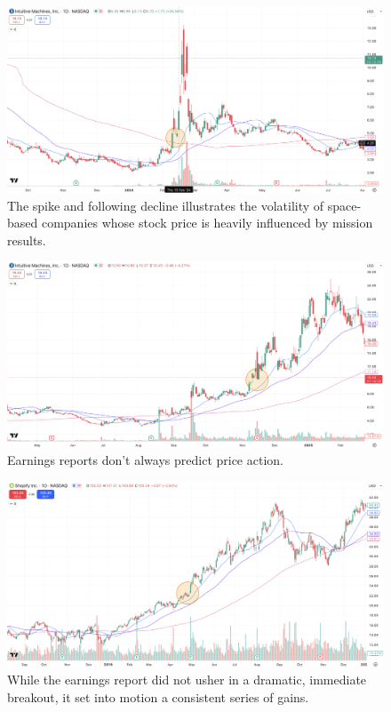 \documentclass[11pt]{article}
\begin{document}
    \begin{figure}[H]
        \centering
        \includegraphics[width=1.0\linewidth]{images/LUNR1.png}
        \caption{The spike and following decline illustrates the volatility of space-based companies whose stock price is heavily influenced by mission results.}
        \label{fig:LUNR1}
    \end{figure}

    \begin{figure}[H]
        \centering
        \includegraphics[width=1.0\linewidth]{images/LUNR2.png}
        \caption{Earnings reports don't always predict price action.}
        \label{fig:LUNR2}
    \end{figure}

    \begin{figure}[H]
        \centering
        \includegraphics[width=1.0\linewidth]{images/SHOP1.png}
        \caption{While the earnings report did not usher in a dramatic, immediate breakout, it set into motion a consistent series of gains.}
        \label{fig:SHOP1}
    \end{figure}
\end{document}
